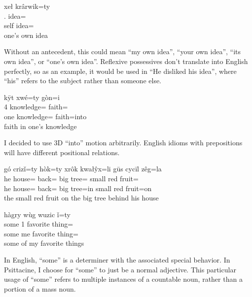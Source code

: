 \documentclass[12pt]{article}
\begin{document}
    \begin{exe}
        \ex
        \glll
        xeł krârwik=ty  \\
        \Refl{}.\Sg{} idea=\Poss{} \\
        self idea=\Poss{} \\
        \glt
        one's own idea
    \end{exe}
    Without an antecedent, this could mean
    ``my own idea'',
    ``your own idea'',
    ``its own idea'',
    or
    ``one's own idea''.
    Reflexive possessives don't translate into English perfectly,
    so as an example,
    it would be used in
    ``He disliked his idea'',
    where ``his'' refers to the subject rather than someone else.

    \begin{exe}
        \ex
        \glll
        kȳt xwé=ty gòn=i \\
        4\Sg{} knowledge=\Poss{} faith=\IllThree{} \\
        one knowledge=\Poss{} faith=into \\
        \glt
        faith in one's knowledge
    \end{exe}
    I decided to use 3D ``into'' motion arbitrarily.
    English idioms with prepositions
    will have different positional relations.

    \begin{exe}
        \ex
        \glll
        gó crizǐ=ty hòk=ty xrôk kwałŷx=li gūs cycīl zêg=la \\
        he house=\Poss{} back=\Poss{} big tree=\InessThree{} small red fruit=\AdessThree{} \\
        he house=\Poss{} back=\Poss{} big tree=in small red fruit=on \\
        \glt
        the small red fruit on the big tree behind his house
    \end{exe}

    \begin{exe}
        \ex
        \glll
        hàgry wùg wuzic ǐ=ty \\
        some 1\Sg{} favorite thing=\Poss{} \\
        some me favorite thing=\Poss{} \\
        \glt
        some of my favorite things
    \end{exe}
    In English, ``some'' is a determiner with the associated special behavior.
    In Psittacine, I choose for ``some'' to just be a normal adjective.
    This particular usage of ``some'' refers to multiple instances of a countable noun,
    rather than a portion of a mass noun.
\end{document}
